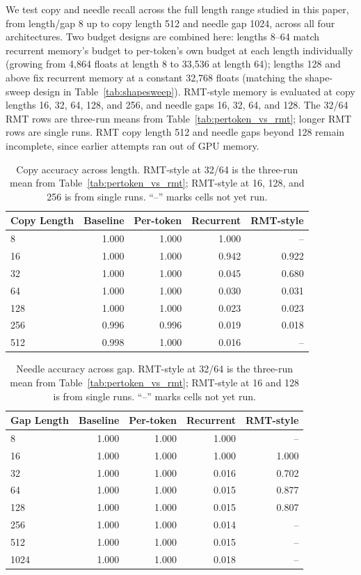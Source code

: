 \documentclass[10pt]{article} %
\begin{document}
We test copy and needle recall across the full length range studied in
this paper, from length/gap 8 up to copy length 512 and needle gap 1024,
across all four architectures. Two budget designs are combined here:
lengths 8--64 match recurrent memory's budget to per-token's own budget
at each length individually (growing from 4{,}864 floats at length 8 to
33{,}536 at length 64); lengths 128 and above fix recurrent memory at a
constant 32,768 floats (matching the shape-sweep design in
Table~\ref{tab:shapesweep}). RMT-style memory is evaluated at copy lengths
16, 32, 64, 128, and 256, and needle gaps 16, 32, 64, and 128. The 32/64
RMT rows are three-run means from Table~\ref{tab:pertoken_vs_rmt}; longer
RMT rows are single runs. RMT copy length 512 and needle gaps beyond 128
remain incomplete, since earlier attempts ran out of GPU memory.

\begin{table}[h]
\centering
\caption{Copy accuracy across length. RMT-style at 32/64 is the
three-run mean from Table~\ref{tab:pertoken_vs_rmt}; RMT-style at 16, 128,
and 256 is from single runs. ``--'' marks cells not yet run.}
\label{tab:basecopy}
\begin{tabular}{lrrrr}
\toprule
Copy Length & Baseline & Per-token & Recurrent & RMT-style \\
\midrule
8   & 1.000 & 1.000 & 1.000 & -- \\
16  & 1.000 & 1.000 & 0.942 & 0.922 \\
32  & 1.000 & 1.000 & 0.045 & 0.680 \\
64  & 1.000 & 1.000 & 0.030 & 0.031 \\
128 & 1.000 & 1.000 & 0.023 & 0.023 \\
256 & 0.996 & 0.996 & 0.019 & 0.018 \\
512 & 0.998 & 1.000 & 0.016 & -- \\
\bottomrule
\end{tabular}
\end{table}

\begin{table}[h]
\centering
\caption{Needle accuracy across gap. RMT-style at 32/64 is the
three-run mean from Table~\ref{tab:pertoken_vs_rmt}; RMT-style at 16 and
128 is from single runs. ``--'' marks cells not yet run.}
\label{tab:baseneedle}
\begin{tabular}{lrrrr}
\toprule
Gap Length & Baseline & Per-token & Recurrent & RMT-style \\
\midrule
8    & 1.000 & 1.000 & 1.000 & -- \\
16   & 1.000 & 1.000 & 1.000 & 1.000 \\
32   & 1.000 & 1.000 & 0.016 & 0.702 \\
64   & 1.000 & 1.000 & 0.015 & 0.877 \\
128  & 1.000 & 1.000 & 0.015 & 0.807 \\
256  & 1.000 & 1.000 & 0.014 & -- \\
512  & 1.000 & 1.000 & 0.015 & -- \\
1024 & 1.000 & 1.000 & 0.018 & -- \\
\bottomrule
\end{tabular}
\end{table}
\end{document}
